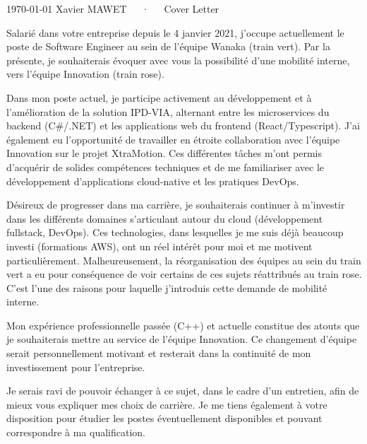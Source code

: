 \documentclass[11pt, a4paper]{custom-awesome-cv}
\begin{document}
\makecvheader
\makecvfooter
  {\today} %
  {Xavier MAWET~~~·~~~Cover Letter} %
  {\thepage} %

\makelettertitle

\begin{cvletter}

Salarié dans votre entreprise depuis le 4 janvier 2021, j'occupe actuellement le poste de Software Engineer au sein de l'équipe Wanaka (train vert).
Par la présente, je souhaiterais évoquer avec vous la possibilité d'une mobilité interne, vers l'équipe Innovation (train rose).

Dans mon poste actuel, je participe activement au développement et à l'amélioration de la solution IPD-VIA, alternant entre les microservices du backend (C\#/.NET) et les applications web du frontend (React/Typescript).
J'ai également eu l'opportunité de travailler en étroite collaboration avec l'équipe Innovation sur le projet XtraMotion.
Ces différentes tâches m'ont permis d'acquérir de solides compétences techniques et de me familiariser avec le développement d'applications cloud-native et les pratiques DevOps.

Désireux de progresser dans ma carrière, je souhaiterais continuer à m'investir dans les différents domaines s'articulant autour du cloud (développement fullstack, DevOps).
Ces technologies, dans lesquelles je me suis déjà beaucoup investi (formations AWS), ont un réel intérêt pour moi et me motivent particulièrement.
Malheureusement, la réorganisation des équipes au sein du train vert a eu pour conséquence de voir certains de ces sujets réattribués au train rose.
C'est l'une des raisons pour laquelle j'introduis cette demande de mobilité interne.

Mon expérience professionnelle passée (C++) et actuelle constitue des atouts que je souhaiterais mettre au service de l'équipe Innovation.
Ce changement d'équipe serait personnellement motivant et resterait dans la continuité de mon investissement pour l'entreprise.

Je serais ravi de pouvoir échanger à ce sujet, dans le cadre d'un entretien, afin de mieux vous expliquer mes choix de carrière.
Je me tiens également à votre disposition pour étudier les postes éventuellement disponibles et pouvant correspondre à ma qualification.

\end{cvletter}

\makeletterclosing
\end{document}
